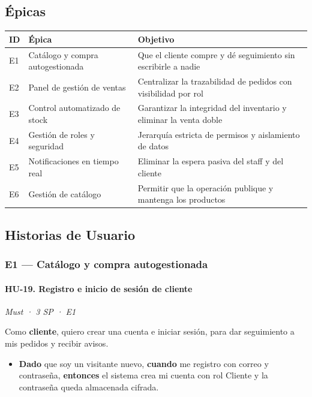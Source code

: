 \documentclass[12pt, a4paper]{article}
\newcommand{\hutag}[3]{\textit{#1 · #2 · #3}\par\vspace{2pt}}
\begin{document}
\subsection{Épicas}
\begin{longtable}{@{}p{1.3cm}p{4.3cm}p{9.5cm}@{}}
\toprule
\textbf{ID} & \textbf{Épica} & \textbf{Objetivo} \\
\midrule
\endhead
E1 & Catálogo y compra autogestionada & Que el cliente compre y dé seguimiento sin escribirle a nadie \\
E2 & Panel de gestión de ventas & Centralizar la trazabilidad de pedidos con visibilidad por rol \\
E3 & Control automatizado de stock & Garantizar la integridad del inventario y eliminar la venta doble \\
E4 & Gestión de roles y seguridad & Jerarquía estricta de permisos y aislamiento de datos \\
E5 & Notificaciones en tiempo real & Eliminar la espera pasiva del staff y del cliente \\
E6 & Gestión de catálogo & Permitir que la operación publique y mantenga los productos \\
\bottomrule
\end{longtable}

\subsection{Historias de Usuario}

\subsubsection{E1 --- Catálogo y compra autogestionada}

\paragraph{HU-19. Registro e inicio de sesión de cliente}
\hutag{Must}{3 SP}{E1}
Como \textbf{cliente}, quiero crear una cuenta e iniciar sesión, para dar seguimiento a mis pedidos y recibir avisos.
\begin{itemize}[leftmargin=*]
    \item \textbf{Dado} que soy un visitante nuevo, \textbf{cuando} me registro con correo y contraseña, \textbf{entonces} el sistema crea mi cuenta con rol Cliente y la contraseña queda almacenada cifrada.
\end{itemize}
\end{document}
